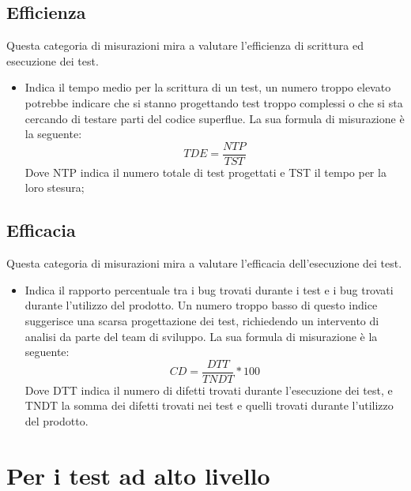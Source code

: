 \documentclass[PianoDiProgetto.tex]{subfiles}
\begin{document}
\subsection{Efficienza}
Questa categoria di misurazioni mira a valutare l'efficienza di scrittura ed esecuzione dei test.
\begin{itemize}
	\item {} Indica il tempo medio per la scrittura di un test, un numero troppo elevato potrebbe indicare che si stanno progettando test troppo complessi o che si sta cercando di testare parti del codice superflue. La sua formula di misurazione è la seguente:
	\[TDE=\dfrac{NTP}{TST}\]
	Dove NTP indica il numero totale di test progettati e TST il tempo per la loro stesura;
	\begin{comment}
	\item \textlink{MTSA005TAB}{MTSA005}{\textbf{MTSA005 Tempo medio per il testing dei bug fix:}} Indica la quantità di tempo medio per testare la risoluzione di un difetto, utile per avere un'idea dell'impatto del testing sull'implementazione di una modifica
	\[TTCD=\dfrac{BFTT}{NDT}\]
	Dove BFTT indica il tempo usato per testare le la correzione dei difetti e NDT il numero di difetti trovati.
	\end{comment}
\end{itemize}
\subsection{Efficacia}
Questa categoria di misurazioni mira a valutare l'efficacia dell'esecuzione dei test.
\begin{itemize}
	\item {} Indica il rapporto percentuale tra i bug trovati durante i test e i bug trovati durante l'utilizzo del prodotto. Un numero troppo basso di questo indice suggerisce una scarsa progettazione dei test, richiedendo un intervento di analisi da parte del team di sviluppo. La sua formula di misurazione è la seguente:
	\[CD=\dfrac{DTT}{TNDT}*100\]
	Dove DTT indica il numero di difetti trovati durante l'esecuzione dei test, e TNDT la somma dei difetti trovati nei test e quelli trovati durante l'utilizzo del prodotto.
\end{itemize}
\section{Per i test ad alto livello}
\end{document}
